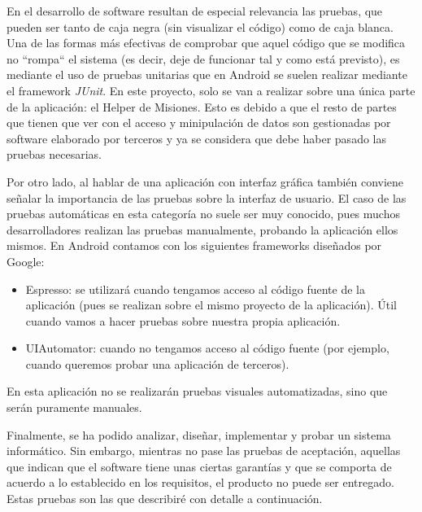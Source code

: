 \documentclass[twoside]{report}
\begin{document}
En el desarrollo de software resultan de especial relevancia las pruebas, que pueden ser tanto de caja negra (sin visualizar el código) como de caja blanca. Una de las formas más efectivas de comprobar que aquel código que se modifica no “rompa“ el sistema (es decir, deje de funcionar tal y como está previsto), es mediante el uso de pruebas unitarias que en Android se suelen realizar mediante el framework \textit{JUnit}. En este proyecto, solo se van a realizar sobre una única parte de la aplicación: el Helper de Misiones. Esto es debido a que el resto de partes que tienen que ver con el acceso y minipulación de datos son gestionadas por software elaborado por terceros y ya se considera que debe haber pasado las pruebas necesarias.

Por otro lado, al hablar de una aplicación con interfaz gráfica también conviene señalar la importancia de las pruebas sobre la interfaz de usuario. El caso de las pruebas automáticas en esta categoría no suele ser muy conocido, pues muchos desarrolladores realizan las pruebas manualmente, probando la aplicación ellos mismos. En Android contamos con los siguientes frameworks diseñados por Google:

\begin{itemize}
\item Espresso: se utilizará cuando tengamos acceso al código fuente de la aplicación (pues se realizan sobre el mismo proyecto de la aplicación). Útil cuando vamos a hacer pruebas sobre nuestra propia aplicación.

\item UIAutomator: cuando no tengamos acceso al código fuente (por ejemplo, cuando queremos probar una aplicación de terceros).

\end{itemize}
En esta aplicación no se realizarán pruebas visuales automatizadas, sino que serán puramente manuales.

Finalmente, se ha podido analizar, diseñar, implementar y probar un sistema informático. Sin embargo, mientras no pase las pruebas de aceptación, aquellas que indican que el software tiene unas ciertas garantías y que se comporta de acuerdo a lo establecido en los requisitos, el producto no puede ser entregado. Estas pruebas son las que describiré con detalle a continuación.
\end{document}

